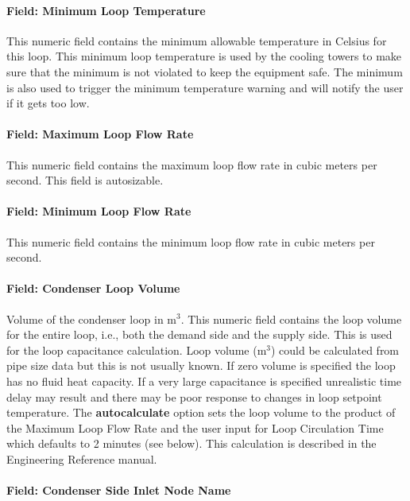 \paragraph{Field: Minimum Loop Temperature}\label{field-minimum-loop-temperature-1}

This numeric field contains the minimum allowable temperature in Celsius for this loop. This minimum loop temperature is used by the cooling towers to make sure that the minimum is not violated to keep the equipment safe. The minimum is also used to trigger the minimum temperature warning and will notify the user if it gets too low.

\paragraph{Field: Maximum Loop Flow Rate}\label{field-maximum-loop-flow-rate-1}

This numeric field contains the maximum loop flow rate in cubic meters per second. This field is autosizable.

\paragraph{Field: Minimum Loop Flow Rate}\label{field-minimum-loop-flow-rate-1}

This numeric field contains the minimum loop flow rate in cubic meters per second.

\paragraph{Field: Condenser Loop Volume}\label{field-condenser-loop-volume}

Volume of the condenser loop in m\(^{3}\). This numeric field contains the loop volume for the entire loop, i.e., both the demand side and the supply side. This is used for the loop capacitance calculation. Loop volume (m\(^{3}\)) could be calculated from pipe size data but this is not usually known. If zero volume is specified the loop has no fluid heat capacity. If a very large capacitance is specified unrealistic time delay may result and there may be poor response to changes in loop setpoint temperature. The \textbf{autocalculate} option sets the loop volume to the product of the Maximum Loop Flow Rate and the user input for Loop Circulation Time which defaults to 2 minutes (see below). This calculation is described in the Engineering Reference manual.

\paragraph{Field: Condenser Side Inlet Node Name}\label{field-condenser-side-inlet-node-name}

